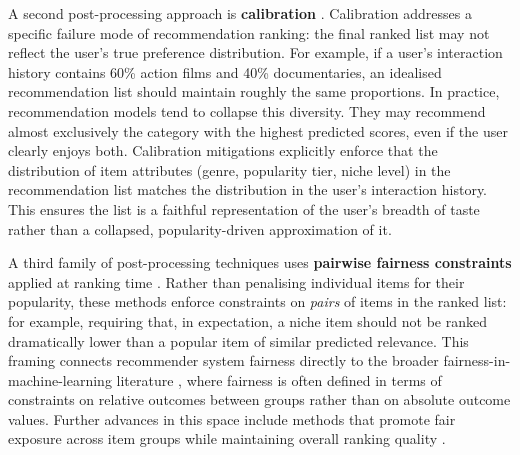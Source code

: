\documentclass[11pt,a4paper]{report}
\begin{document}
A second post-processing approach is \textbf{calibration} \citep{steck2018calibrated}. Calibration addresses a specific failure mode of recommendation ranking: the final ranked list may not reflect the user's true preference distribution. For example, if a user's interaction history contains 60\% action films and 40\% documentaries, an idealised recommendation list should maintain roughly the same proportions. In practice, recommendation models tend to collapse this diversity. They may recommend almost exclusively the category with the highest predicted scores, even if the user clearly enjoys both. Calibration mitigations explicitly enforce that the distribution of item attributes (genre, popularity tier, niche level) in the recommendation list matches the distribution in the user's interaction history. This ensures the list is a faithful representation of the user's breadth of taste rather than a collapsed, popularity-driven approximation of it.

A third family of post-processing techniques uses \textbf{pairwise fairness constraints} applied at ranking time \citep{beutel2019pairwise}. Rather than penalising individual items for their popularity, these methods enforce constraints on \emph{pairs} of items in the ranked list: for example, requiring that, in expectation, a niche item should not be ranked dramatically lower than a popular item of similar predicted relevance. This framing connects recommender system fairness directly to the broader fairness-in-machine-learning literature \citep{barocashardt2016fairness, dwork2012fairness}, where fairness is often defined in terms of constraints on relative outcomes between groups rather than on absolute outcome values. Further advances in this space include methods that promote fair exposure across item groups while maintaining overall ranking quality \citep{biega2018equity, singh2018fairness}.
\end{document}
